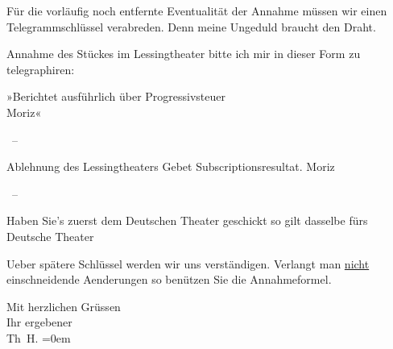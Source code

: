 \pstart
           Für die vorläufig noch entfernte Eventualität der Annahme müssen wir einen
               Telegrammschlüssel verabreden. Denn meine Ungeduld braucht den Draht.\pend
           
\pstart
           Annahme des Stückes im Lessingtheater bitte ich mir in dieser Form zu
               telegraphiren:\pend
           
\pstart
           »Berichtet ausführlich über Progressivsteuer{\\} Moriz«\pend
           
\pstart
           \centering{} – \pend
           
\pstart
           Ablehnung des Lessingtheaters Gebet Subscriptionsresultat. Moriz\pend
           
\pstart
           \centering{} – \pend
           
\pstart
           \pend
           
\pstart
           Haben Sie’s zuerst dem Deutschen Theater
               geschickt so gilt dasselbe fürs Deutsche Theater\pend
           
\pstart
           Ueber spätere Schlüssel werden wir uns verständigen. Verlangt man \uline{nicht} einschneidende Aenderungen so benützen Sie die
               Annahmeformel.\pend
           
\pstart
           Mit herzlichen Grüssen{\\[\baselineskip]}Ihr ergebener{\\[\baselineskip]}\spacefill\mbox{Th H.}\pend
           \leftskip=0em{}\endnumbering{}
\begin{anhang}
\end{anhang}\newcommand{\dateiname}{L03844}\newcommand{\titel}{Theodor Herzl an Arthur Schnitzler, 4. 1. 1895}\newcommand{\editorInnen}{Selma Jahnke und Martin Anton Müller}
